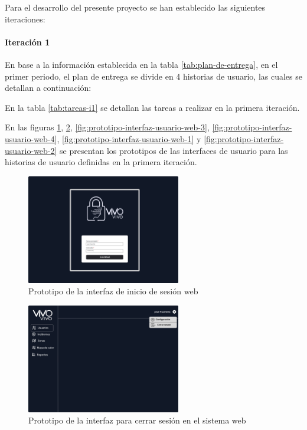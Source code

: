 Para el desarrollo del presente proyecto se han establecido las siguientes iteraciones:

\paragraph{Iteración 1}

En base a la información establecida en la tabla \ref{tab:plan-de-entrega}, en el primer periodo, el plan de
entrega se divide en 4 historias de usuario, las cuales se detallan a continuación:



En la tabla \ref{tab:tareas-i1} se detallan las tareas a realizar en la primera iteración.



En las figuras \ref{fig:prototipo-inicio-sesion-web}, \ref{fig:prototipo-layout-web}, \ref{fig:prototipo-interfaz-usuario-web-3},
\ref{fig:prototipo-interfaz-usuario-web-4}, \ref{fig:prototipo-interfaz-usuario-web-1} y \ref{fig:prototipo-interfaz-usuario-web-2}
se presentan los prototipos de las interfaces de usuario para las historias de usuario definidas en la primera iteración.

\begin{figure}[H]
      \centering
      \includegraphics[width=0.6\textwidth]{chapters/III-resultados-y-discusion/resources/images/prototipo-inicio-sesion-web.png}
      \caption{Prototipo de la interfaz de inicio de sesión web}
      \label{fig:prototipo-inicio-sesion-web}
\end{figure}

\begin{figure}[H]
      \centering
      \includegraphics[width=0.6\textwidth]{chapters/III-resultados-y-discusion/resources/images/prototipo-layout-web.png}
      \caption{Prototipo de la interfaz para cerrar sesión en el sistema web}
      \label{fig:prototipo-layout-web}
\end{figure}


